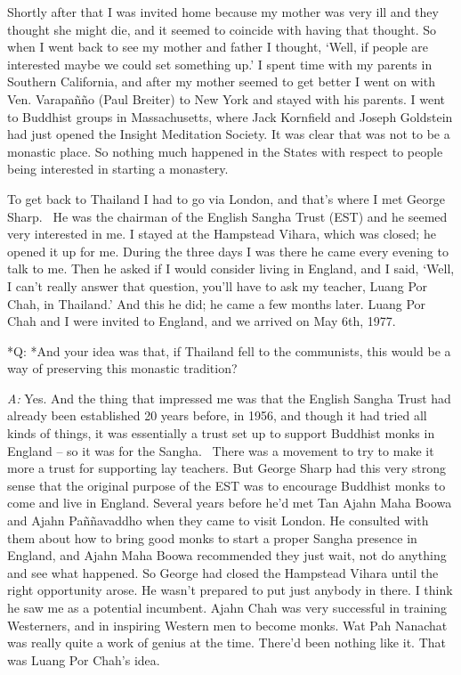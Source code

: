 Shortly after that I was invited home because my mother was very ill and
they thought she might die, and it seemed to coincide with having that
thought. So when I went back to see my mother and father I thought,
`Well, if people are interested maybe we could set something up.' I
spent time with my parents in Southern California, and after my mother
seemed to get better I went on with Ven. Varapañño (Paul Breiter) to New
York and stayed with his parents. I went to Buddhist groups in
Massachusetts, where Jack Kornfield and Joseph Goldstein had just opened
the Insight Meditation Society. It was clear that was not to be a
monastic place. So nothing much happened in the States with respect to
people being interested in starting a monastery.

To get back to Thailand I had to go via London, and that's where I met
George Sharp.~ He was the chairman of the English Sangha Trust (EST) and
he seemed very interested in me. I stayed at the Hampstead Vihara, which
was closed; he opened it up for me. During the three days I was there he
came every evening to talk to me. Then he asked if I would consider
living in England, and I said, `Well, I can't really answer that
question, you'll have to ask my teacher, Luang Por Chah, in Thailand.'
And this he did; he came a few months later. Luang Por Chah and I were
invited to England, and we arrived on May 6th, 1977.

*Q: *And your idea was that, if Thailand fell to the communists, this
would be a way of preserving this monastic tradition?

\emph{A:} Yes. And the thing that impressed me was that the English
Sangha Trust had already been established 20 years before, in 1956, and
though it had tried all kinds of things, it was essentially a trust set
up to support Buddhist monks in England -- so it was for the Sangha.~
There was a movement to try to make it more a trust for supporting lay
teachers. But George Sharp had this very strong sense that the original
purpose of the EST was to encourage Buddhist monks to come and live in
England. Several years before he'd met Tan Ajahn Maha Boowa and Ajahn
Paññavaddho when they came to visit London. He consulted with them about
how to bring good monks to start a proper Sangha presence in England,
and Ajahn Maha Boowa recommended they just wait, not do anything and see
what happened. So George had closed the Hampstead Vihara until the right
opportunity arose. He wasn't prepared to put just anybody in there. I
think he saw me as a potential incumbent. Ajahn Chah was very successful
in training Westerners, and in inspiring Western men to become monks.
Wat Pah Nanachat was really quite a work of genius at the time. There'd
been nothing like it. That was Luang Por Chah's idea.

